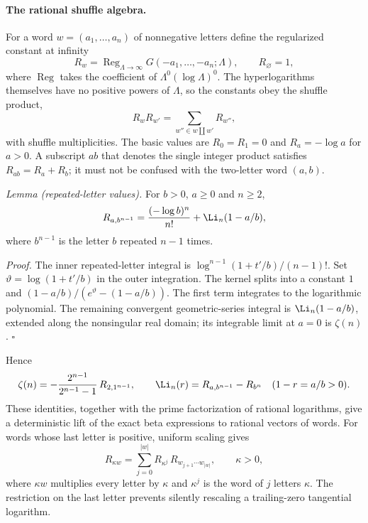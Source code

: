 \paragraph{The rational shuffle algebra.} For a word $w=(a_1,\ldots,a_n)$ of nonnegative letters define the
regularized constant at infinity
\begin{equation}
 R_w=\operatorname{Reg}_{\Lambda\to\infty}G(-a_1,\ldots,-a_n;\Lambda),\qquad R_\varnothing=1,
 \label{sri:eq:dualC:Rw}
\end{equation}
where $\operatorname{Reg}$ takes the coefficient of $\Lambda^0(\log\Lambda)^0$. The hyperlogarithms themselves have no
positive powers of $\Lambda$, so the constants obey the shuffle product,
\begin{equation}
 R_wR_{w'}=\sum_{w''\in w\mathbin{\amalg}w'}R_{w''},
\end{equation}
with shuffle multiplicities. The basic values are $R_0=R_1=0$ and $R_a=-\log a$ for $a>0$. A subscript $ab$ that
denotes the single integer product satisfies $R_{ab}=R_a+R_b$; it must not be confused with the two-letter word $(a,b)$.

\emph{Lemma (repeated-letter values).} For $b>0$, $a\ge0$ and $n\ge2$,
\begin{equation}
 R_{a,b^{n-1}}=\frac{(-\log b)^n}{n!}+\Li_n(1-a/b),
 \label{sri:eq:dualC:repeated}
\end{equation}
where $b^{n-1}$ is the letter $b$ repeated $n-1$ times.

\emph{Proof.} The inner repeated-letter integral is $\log^{n-1}(1+t'/b)/(n-1)!$. Set $\vartheta=\log(1+t'/b)$ in the outer
integration. The kernel splits into a constant $1$ and $(1-a/b)/(e^\vartheta-(1-a/b))$. The first term integrates to the
logarithmic polynomial. The remaining convergent geometric-series integral is $\Li_n(1-a/b)$, extended along the
nonsingular real domain; its integrable limit at $a=0$ is $\zeta(n)$. $\square$

Hence
\begin{equation}
 \zeta(n)=-\frac{2^{n-1}}{2^{n-1}-1}\,R_{2,1^{n-1}},\qquad
 \Li_n(r)=R_{a,b^{n-1}}-R_{b^n}\quad(1-r=a/b>0).
\end{equation}
These identities, together with the prime factorization of rational logarithms, give a deterministic lift of the exact
beta expressions to rational vectors of words. For words whose last letter is positive, uniform scaling gives
\begin{equation}
 R_{\kappa w}=\sum_{j=0}^{|w|}R_{\kappa^j}\,R_{w_{j+1}\cdots w_{|w|}},\qquad \kappa>0,
\end{equation}
where $\kappa w$ multiplies every letter by $\kappa$ and $\kappa^j$ is the word of $j$ letters $\kappa$. The restriction
on the last letter prevents silently rescaling a trailing-zero tangential logarithm.

